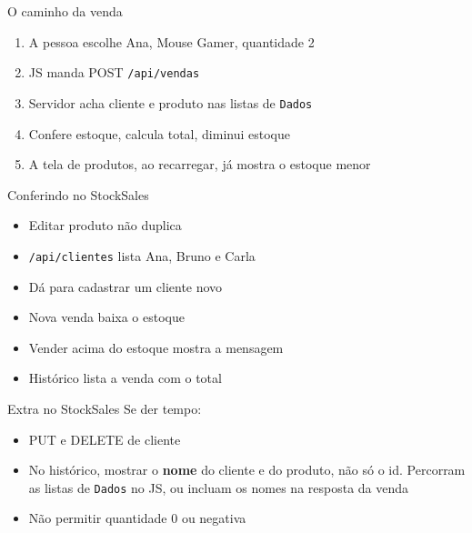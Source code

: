 \documentclass[aspectratio=169,11pt]{beamer}
\begin{document}
\begin{frame}{O caminho da venda}
  \begin{enumerate}
    \item A pessoa escolhe Ana, Mouse Gamer, quantidade 2
    \item JS manda POST \texttt{/api/vendas}
    \item Servidor acha cliente e produto nas listas de
          \texttt{Dados}
    \item Confere estoque, calcula total, diminui estoque
    \item A tela de produtos, ao recarregar, já mostra
          o estoque menor
  \end{enumerate}
\end{frame}

\begin{frame}{Conferindo no StockSales}
  \begin{itemize}
    \item [ ] Editar produto não duplica
    \item [ ] \texttt{/api/clientes} lista Ana, Bruno e Carla
    \item [ ] Dá para cadastrar um cliente novo
    \item [ ] Nova venda baixa o estoque
    \item [ ] Vender acima do estoque mostra a mensagem
    \item [ ] Histórico lista a venda com o total
  \end{itemize}
\end{frame}

\begin{frame}{Extra no StockSales}
  Se der tempo:

  \vspace{0.4em}
  \begin{itemize}
    \item PUT e DELETE de cliente
    \item No histórico, mostrar o \textbf{nome} do cliente
          e do produto, não só o id. Percorram as listas
          de \texttt{Dados} no JS, ou incluam os nomes
          na resposta da venda
    \item Não permitir quantidade 0 ou negativa
  \end{itemize}
\end{frame}
\end{document}
